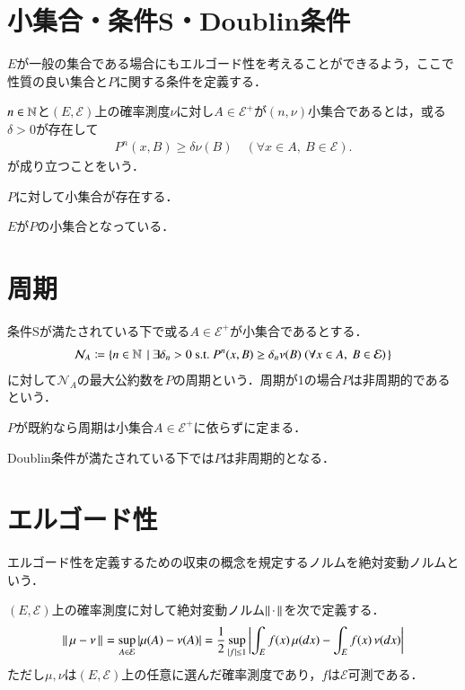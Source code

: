 \section{小集合・条件S・Doublin条件}
	$E$が一般の集合である場合にもエルゴード性を考えることができるよう，ここで性質の良い集合と$P$に関する条件を定義する．
	
	\begin{dfn}[小集合]
		$n \in \mathbb{N}$と$(E,\mathcal{E})$上の確率測度$\nu$に対し$A \in \mathcal{E}^+$が$(n,\nu)$小集合であるとは，或る$\delta > 0$が存在して
		\begin{align}
			P^n(x,B) \geq \delta \nu(B) \quad (\forall x \in A,\ B \in \mathcal{E}).
		\end{align}
		が成り立つことをいう．
	\end{dfn}
	
	\begin{dfn}[条件S]
		$P$に対して小集合が存在する．
	\end{dfn}
	
	\begin{dfn}[Doublin条件]
		$E$が$P$の小集合となっている．
	\end{dfn}
	
\section{周期}
	\begin{dfn}[周期]
		条件Sが満たされている下で或る$A \in \mathcal{E}^+$が小集合であるとする．
		\begin{align}
			\mathcal{N}_A \coloneqq \left\{ n \in \mathbb{N}\ \left|\ \exists \delta_n > 0\ \mathrm{s.t.}\ P^n(x,B) \geq \delta_n \nu(B)\ (\forall x \in A,\ B \in \mathcal{E}) \right.\right\}
		\end{align}
		に対して$\mathcal{N}_A$の最大公約数を$P$の周期という．周期が1の場合$P$は非周期的であるという．
	\end{dfn}
	
	\begin{prp}[周期の一意性]
		$P$が既約なら周期は小集合$A \in \mathcal{E}^+$に依らずに定まる．
	\end{prp}
	
	\begin{prp}
		Doublin条件が満たされている下では$P$は非周期的となる．
	\end{prp}
	
\section{エルゴード性}
	エルゴード性を定義するための収束の概念を規定するノルムを絶対変動ノルムという．
	\begin{dfn}[絶対変動ノルム]
		$(E,\mathcal{E})$上の確率測度に対して絶対変動ノルム$\left\|\, \cdot\, \right\|_{}$を次で定義する．
		\begin{align}
			\left\|\, \mu - \nu\, \right\|_{} = \operatorname*{sup}_{A \in \mathcal{E}} |\mu(A) - \nu(A)| = \frac{1}{2} \operatorname*{sup}_{|f| \leq 1} \left|\int_E f(x)\, \mu(dx) - \int_E f(x)\, \nu(dx)\right|
		\end{align}
		ただし$\mu,\nu$は$(E,\mathcal{E})$上の任意に選んだ確率測度であり，$f$は$\mathcal{E}$可測である．
	\end{dfn}
	
